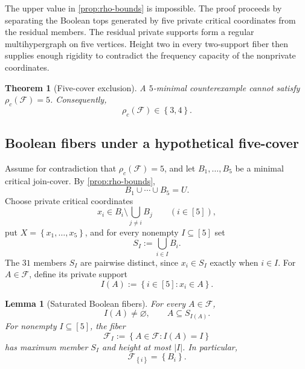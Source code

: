 \documentclass[11pt,reqno]{amsart}
\numberwithin{equation}{section}
\newtheorem{theorem}{Theorem}[section]
\newtheorem{lemma}[lemma]{Lemma}
\theoremstyle{definition}
\theoremstyle{remark}
\newcommand{\F}{\mathcal{F}}
\newcommand{\1}{\mathbf{1}}
\newcommand{\set}[1]{\left\{#1\right\}}
\newcommand{\abs}[1]{\left|#1\right|}
\begin{document}
The upper value in \cref{prop:rho-bounds} is impossible.  The proof proceeds by separating the Boolean tops generated by five private critical coordinates from the residual members.  The residual private supports form a regular multihypergraph on five vertices.  Height two in every two-support fiber then supplies enough rigidity to contradict the frequency capacity of the nonprivate coordinates.

\begin{theorem}[Five-cover exclusion]\label{thm:five-cover-exclusion}
A \(5\)-minimal counterexample cannot satisfy \(\rho_c(\F)=5\).  Consequently,
\begin{equation}\label{eq:rho-34}
\boxed{\rho_c(\F)\in\set{3,4}.}
\end{equation}
\end{theorem}

\subsection{Boolean fibers under a hypothetical five-cover}

Assume for contradiction that \(\rho_c(\F)=5\), and let \(B_1,\dots,B_5\) be a minimal critical join-cover.  By \cref{prop:rho-bounds},
\begin{equation}\label{eq:five-cover-U}
B_1\cup\cdots\cup B_5=U.
\end{equation}
Choose private critical coordinates
\begin{equation}\label{eq:private-xi}
x_i\in B_i\setminus\bigcup_{j\ne i}B_j
\qquad(i\in[5]),
\end{equation}
put \(X=\set{x_1,\dots,x_5}\), and for every nonempty \(I\subseteq[5]\) set
\begin{equation}\label{eq:SI}
S_I:=\bigcup_{i\in I}B_i.
\end{equation}
The \(31\) members \(S_I\) are pairwise distinct, since \(x_i\in S_I\) exactly when \(i\in I\).
For \(A\in\F\), define its private support
\[
I(A):=\set{i\in[5]:x_i\in A}.
\]

\begin{lemma}[Saturated Boolean fibers]\label{lem:boolean-fibers}
For every \(A\in\F\),
\begin{equation}\label{eq:saturated-containment}
I(A)\ne\varnothing,
\qquad
A\subseteq S_{I(A)}.
\end{equation}
For nonempty \(I\subseteq[5]\), the fiber
\[
\F_I:=\set{A\in\F:I(A)=I}
\]
has maximum member \(S_I\) and height at most \(\abs I\).  In particular,
\begin{equation}\label{eq:singleton-fiber}
\F_{\set{i}}=\set{B_i}.
\end{equation}
\end{lemma}
\end{document}
